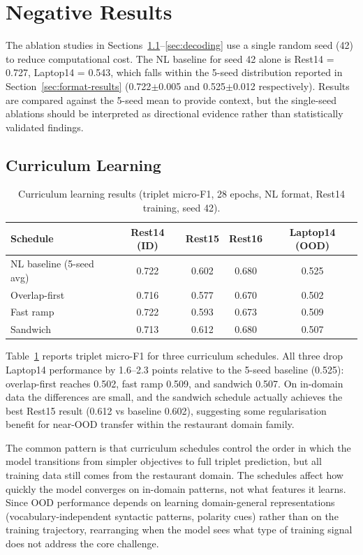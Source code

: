 \documentclass[12pt,a4paper]{report}
\begin{document}
\section{Negative Results}\label{sec:negative}

The ablation studies in Sections~\ref{sec:curriculum}--\ref{sec:decoding} use a single random seed (42) to reduce computational cost. The NL baseline for seed 42 alone is Rest14 = 0.727, Laptop14 = 0.543, which falls within the 5-seed distribution reported in Section~\ref{sec:format-results} (0.722$\pm$0.005 and 0.525$\pm$0.012 respectively). Results are compared against the 5-seed mean to provide context, but the single-seed ablations should be interpreted as directional evidence rather than statistically validated findings.

\subsection{Curriculum Learning}\label{sec:curriculum}

\begin{table}[H]
\centering
\caption{Curriculum learning results (triplet micro-F1, 28 epochs, NL format, Rest14 training, seed 42).}
\label{tab:curriculum}
\small
\begin{tabular}{@{}lcccc@{}}
\toprule
\textbf{Schedule} & \textbf{Rest14 (ID)} & \textbf{Rest15} & \textbf{Rest16} & \textbf{Laptop14 (OOD)} \\
\midrule
NL baseline (5-seed avg) & 0.722 & 0.602 & 0.680 & 0.525 \\
\midrule
Overlap-first & 0.716 & 0.577 & 0.670 & 0.502 \\
Fast ramp & 0.722 & 0.593 & 0.673 & 0.509 \\
Sandwich & 0.713 & 0.612 & 0.680 & 0.507 \\
\bottomrule
\end{tabular}
\end{table}

Table~\ref{tab:curriculum} reports triplet micro-F1 for three curriculum schedules. All three drop Laptop14 performance by 1.6--2.3 points relative to the 5-seed baseline (0.525): overlap-first reaches 0.502, fast ramp 0.509, and sandwich 0.507. On in-domain data the differences are small, and the sandwich schedule actually achieves the best Rest15 result (0.612 vs baseline 0.602), suggesting some regularisation benefit for near-OOD transfer within the restaurant domain family.

The common pattern is that curriculum schedules control the order in which the model transitions from simpler objectives to full triplet prediction, but all training data still comes from the restaurant domain. The schedules affect how quickly the model converges on in-domain patterns, not what features it learns. Since OOD performance depends on learning domain-general representations (vocabulary-independent syntactic patterns, polarity cues) rather than on the training trajectory, rearranging when the model sees what type of training signal does not address the core challenge.
\end{document}
